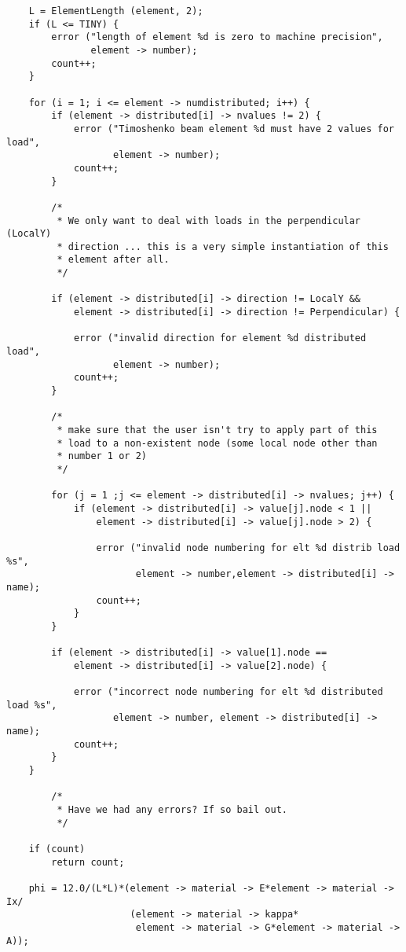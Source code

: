 {\begin{screen}
\begin{verbatim}
    L = ElementLength (element, 2);
    if (L <= TINY) {
        error ("length of element %d is zero to machine precision",
               element -> number);
        count++;
    }   

    for (i = 1; i <= element -> numdistributed; i++) {
        if (element -> distributed[i] -> nvalues != 2) {
            error ("Timoshenko beam element %d must have 2 values for load",
                   element -> number);
            count++;
        }

        /*
         * We only want to deal with loads in the perpendicular (LocalY)
         * direction ... this is a very simple instantiation of this
         * element after all.
         */

        if (element -> distributed[i] -> direction != LocalY &&
            element -> distributed[i] -> direction != Perpendicular) {
        
            error ("invalid direction for element %d distributed load",
                   element -> number);
            count++;
        }
              
        /*
         * make sure that the user isn't try to apply part of this
         * load to a non-existent node (some local node other than
         * number 1 or 2)
         */

        for (j = 1 ;j <= element -> distributed[i] -> nvalues; j++) {
            if (element -> distributed[i] -> value[j].node < 1 ||
                element -> distributed[i] -> value[j].node > 2) {

                error ("invalid node numbering for elt %d distrib load %s",
                       element -> number,element -> distributed[i] -> name);
                count++;
            }
        }

        if (element -> distributed[i] -> value[1].node ==
            element -> distributed[i] -> value[2].node) {

            error ("incorrect node numbering for elt %d distributed load %s",
                   element -> number, element -> distributed[i] -> name);
            count++;
        }
    }

        /* 
         * Have we had any errors? If so bail out.
         */

    if (count) 
        return count;

    phi = 12.0/(L*L)*(element -> material -> E*element -> material -> Ix/
                      (element -> material -> kappa*
                       element -> material -> G*element -> material -> A));


\end{verbatim}
\end{screen}}
